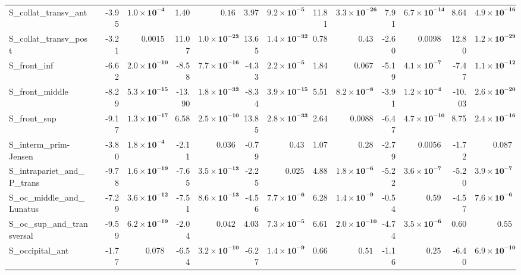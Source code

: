{\begin{longtable}{llrrrrrrrrrrrr}
S\_collat\_transv\_ant &  & -3.95 & $\mathbf{1.0{\times}10^{-4}}$ & 1.40 & $0.16$ & 3.97 & $\mathbf{9.2{\times}10^{-5}}$ & 11.81 & $\mathbf{3.3{\times}10^{-26}}$ & 7.91 & $\mathbf{6.7{\times}10^{-14}}$ & 8.64 & $\mathbf{4.9{\times}10^{-16}}$ \\
S\_collat\_transv\_post &  & -3.21 & $0.0015$ & 11.07 & $\mathbf{1.0{\times}10^{-23}}$ & 13.65 & $\mathbf{1.4{\times}10^{-32}}$ & 0.78 & $0.43$ & -2.60 & $0.0098$ & 12.80 & $\mathbf{1.2{\times}10^{-29}}$ \\
S\_front\_inf &  & -6.62 & $\mathbf{2.0{\times}10^{-10}}$ & -8.58 & $\mathbf{7.7{\times}10^{-16}}$ & -4.33 & $\mathbf{2.2{\times}10^{-5}}$ & 1.84 & $0.067$ & -5.19 & $\mathbf{4.1{\times}10^{-7}}$ & -7.47 & $\mathbf{1.1{\times}10^{-12}}$ \\
S\_front\_middle &  & -8.29 & $\mathbf{5.3{\times}10^{-15}}$ & -13.90 & $\mathbf{1.8{\times}10^{-33}}$ & -8.34 & $\mathbf{3.9{\times}10^{-15}}$ & 5.51 & $\mathbf{8.2{\times}10^{-8}}$ & -3.91 & $\mathbf{1.2{\times}10^{-4}}$ & -10.03 & $\mathbf{2.6{\times}10^{-20}}$ \\
S\_front\_sup &  & -9.17 & $\mathbf{1.3{\times}10^{-17}}$ & 6.58 & $\mathbf{2.5{\times}10^{-10}}$ & 13.85 & $\mathbf{2.8{\times}10^{-33}}$ & 2.64 & $0.0088$ & -6.47 & $\mathbf{4.7{\times}10^{-10}}$ & 8.75 & $\mathbf{2.4{\times}10^{-16}}$ \\
S\_interm\_prim-Jensen &  & -3.80 & $\mathbf{1.8{\times}10^{-4}}$ & -2.11 & $0.036$ & -0.79 & $0.43$ & 1.07 & $0.28$ & -2.79 & $0.0056$ & -1.72 & $0.087$ \\
S\_intrapariet\_and\_P\_trans &  & -9.78 & $\mathbf{1.6{\times}10^{-19}}$ & -7.65 & $\mathbf{3.5{\times}10^{-13}}$ & -2.25 & $0.025$ & 4.88 & $\mathbf{1.8{\times}10^{-6}}$ & -5.22 & $\mathbf{3.6{\times}10^{-7}}$ & -5.20 & $\mathbf{3.9{\times}10^{-7}}$ \\
S\_oc\_middle\_and\_Lunatus &  & -7.29 & $\mathbf{3.6{\times}10^{-12}}$ & -7.51 & $\mathbf{8.6{\times}10^{-13}}$ & -4.56 & $\mathbf{7.7{\times}10^{-6}}$ & 6.28 & $\mathbf{1.4{\times}10^{-9}}$ & -0.54 & $0.59$ & -4.57 & $\mathbf{7.6{\times}10^{-6}}$ \\
S\_oc\_sup\_and\_transversal &  & -9.59 & $\mathbf{6.2{\times}10^{-19}}$ & -2.04 & $0.042$ & 4.03 & $\mathbf{7.3{\times}10^{-5}}$ & 6.61 & $\mathbf{2.0{\times}10^{-10}}$ & -4.74 & $\mathbf{3.5{\times}10^{-6}}$ & 0.60 & $0.55$ \\
S\_occipital\_ant &  & -1.77 & $0.078$ & -6.54 & $\mathbf{3.2{\times}10^{-10}}$ & -6.27 & $\mathbf{1.4{\times}10^{-9}}$ & 0.66 & $0.51$ & -1.16 & $0.25$ & -6.40 & $\mathbf{6.9{\times}10^{-10}}$ \\

\end{longtable}}
